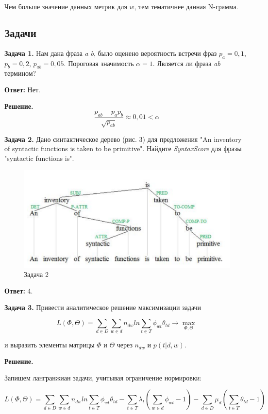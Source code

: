 Чем больше значение данных метрик для $w$, тем тематичнее данная N-грамма.

\subsection*{Задачи}

\textbf{Задача 1.} Нам дана фраза \textit{a} \textit{b}, было оценено вероятность встречи фраз $p_{a} = 0,1$, $p_{b} = 0,2$, $p_{ab} = 0,05$. Пороговая значимость $\alpha = 1$. Является ли фраза \textit{ab} термином?

\textbf{Ответ:} Нет.

\textbf{Решение.} 
$$\frac{p_{ab}-p_{a}p_{b}}{\sqrt{p_{ab}}} \approx 0,01 < \alpha$$

 \textbf{Задача 2.} Дано синтактическое дерево (рис. 3) для предложения "An inventory of syntactic functions is taken to be primitive". Найдите \textit{SyntaxScore} для фразы "syntactic functions is".
 
\begin{figure}
    \includegraphics[scale = 0.4]{images/ml3.png}
    \caption{Задача 2}
\end{figure}

\textbf{Ответ:} 4.

\textbf{Задача 3.} Привести аналитическое решение максимизации задачи

$$L(\Phi, \Theta) = \sum_{d \in D} \sum_{w \in d} n_{dw} ln \sum_{t \in T} \phi_{wt} \theta_{td} \rightarrow \max_{\Phi, \Theta}$$

и выразить элементы матрицы $\Phi$ и $\Theta$ через $n_{dw}$ и $p(t|d,w)$.

\textbf{Решение.}

Запишем лангранжиан задачи, учитывая ограничение нормировки:

$$L(\Phi, \Theta) = \sum_{d \in D} \sum_{w \in d} n_{dw} ln \sum_{t \in T} \phi_{wt} \theta_{td} - \sum_{t \in T} \lambda_{t} (\sum_{w \in d} \phi_{wt} - 1) - \sum_{d \in D} \mu_{d} (\sum_{t \in T} \theta_{td} - 1)$$

